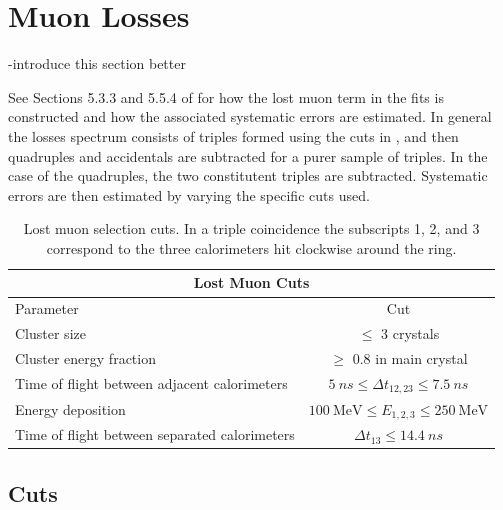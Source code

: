
\graphicspath{{Body/Figures/MuonLosses/}}

\section{Muon Losses}

-introduce this section better

See Sections 5.3.3 and 5.5.4 of  for how the lost muon term in the fits is constructed and how the associated systematic errors are estimated. In general the losses spectrum consists of triples formed using the cuts in , and then quadruples and accidentals are subtracted for a purer sample of triples. In the case of the quadruples, the two constitutent triples are subtracted. Systematic errors are then estimated by varying the specific cuts used.


\begin{table}[]
\centering
\setlength\tabcolsep{10pt}
\renewcommand{\arraystretch}{1.2}
\begin{tabular*}{1\linewidth}{@{\extracolsep{\fill}}lc}
  \hline
    \multicolumn{2}{c}{\textbf{Lost Muon Cuts}} \\
  \hline\hline
    Parameter & Cut \\
  \hline
    Cluster size & $\leq$ 3 crystals \\
    Cluster energy fraction & $\geq$ 0.8 in main crystal \\
    Time of flight between adjacent calorimeters & $\SI{5}{ns} \leq \Delta t_{12, 23} \leq \SI{7.5}{ns}$ \\
    Energy deposition & $\SI{100}{\MeV} \leq E_{1,2,3} \leq \SI{250}{\MeV}$ \\
    Time of flight between separated calorimeters & $\Delta t_{13} \leq \SI{14.4}{ns}$ \\
  \hline 
\end{tabular*}
\caption[Lost muon cuts]{Lost muon selection cuts. In a triple coincidence the subscripts 1, 2, and 3 correspond to the three calorimeters hit clockwise around the ring.}
\label{tab:lostmuoncuts}
\end{table}



\subsection{Cuts}

